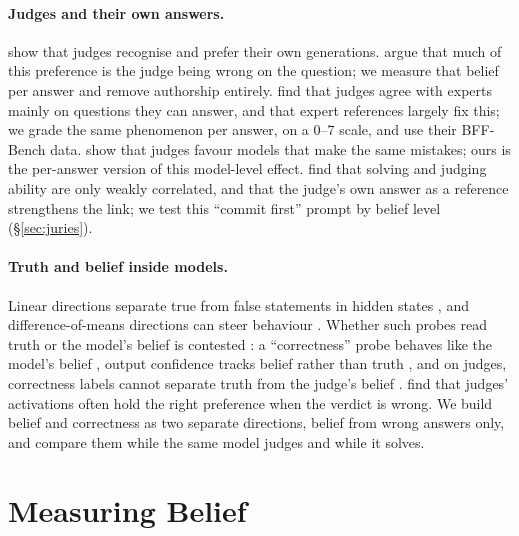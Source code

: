 \documentclass[11pt]{article}
\begin{document}
\paragraph{Judges and their own answers.}
\citet{panickssery2024llm} show that judges recognise and prefer their own generations. \citet{roytburg2026narcissists}
argue that much of this preference is the judge being wrong on the question; we measure that belief per answer and
remove authorship entirely. \citet{krumdick2026nofreelabels} find that judges agree with experts mainly on questions
they can answer, and that expert references largely fix this; we grade the same phenomenon per answer, on a 0--7
scale, and use their BFF-Bench data. \citet{goel2025great} show that judges favour models that make the same
mistakes; ours is the per-answer version of this model-level effect. \citet{lin-etal-2025-before} find that solving
and judging ability are only weakly correlated, and that the judge's own answer as a reference strengthens the link;
we test this ``commit first'' prompt by belief level (\S\ref{sec:juries}).

\paragraph{Truth and belief inside models.}
Linear directions separate true from false statements in hidden states \citep{marks2024geometry,burns2023discovering,
azaria-mitchell-2023-internal}, and difference-of-means directions can steer behaviour
\citep{rimsky-etal-2024-steering,arditi2024refusal,zou2023representation}. Whether such probes read truth or the
model's belief is contested \citep{herrmann2025standards}: a ``correctness'' probe behaves like the model's belief
\citep{yang2026admit}, output confidence tracks belief rather than truth \citep{cho2026confidence}, and on judges,
correctness labels cannot separate truth from the judge's belief \citep{gulati2026auditing}.
\citet{mukherjee2026opening} find that judges' activations often hold the right preference when the verdict is
wrong. We build belief and correctness as two separate directions, belief from wrong answers only, and compare them
while the same model judges and while it solves.

\section{Measuring Belief}
\label{sec:setup}
\end{document}
